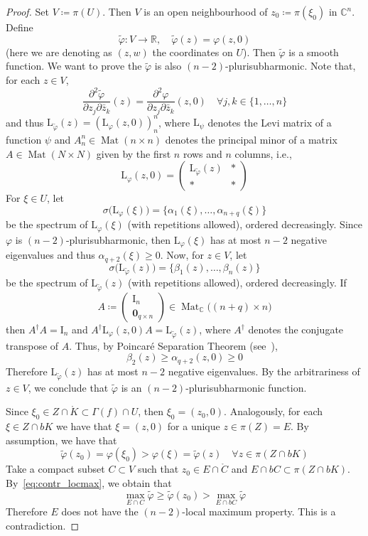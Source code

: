 \documentclass[reqno,oneside]{amsart}
\newcommand{\numberset}{\mathbb}
\newcommand{\R}{\numberset{R}}
\newcommand{\C}{\numberset{C}}
\renewcommand{\phi}{\varphi}
\DeclareMathOperator{\Mat}{Mat}
\renewcommand{\vec}{\boldsymbol}
\theoremstyle{definition}
\theoremstyle{plain}
\theoremstyle{remark}
\begin{document}
\begin{proof}
	Set $V\coloneqq\pi(U)$. Then $V$ is an open neighbourhood of $z_0\coloneqq\pi(\xi_0)$ in $\C^n$. Define
	\[
		\tilde\phi:V\to\R, \quad \tilde\phi(z)=\phi(z,0)
	\]
	(here we are denoting as $(z,w)$ the coordinates on $U$). Then $\tilde\phi$ is a smooth function. We want to prove the $\tilde\phi$ is also $(n-2)$-plurisubharmonic. Note that, for each $z\in V$,
	\[
		\frac{\partial^2\tilde\phi}{\partial z_j\partial\bar{z}_k}(z)=\frac{\partial^2\phi}{\partial z_j\partial\bar{z}_k}(z,0) \quad \forall j,k\in\{1,\dots,n\}
	\]
	and thus $\mathrm{L}_{\tilde\phi}(z)=(\mathrm{L}_\phi(z,0))^n_n$, where $\mathrm{L}_\psi$ denotes the Levi matrix of a function $\psi$ and $A^n_n\in\Mat(n\times n)$ denotes the principal minor of a matrix $A\in\Mat(N\times N)$ given by the first $n$ rows and $n$ columns, i.e.,
	\[
		\mathrm{L}_\phi(z,0)=
		\begin{pmatrix}
			\mathrm{L}_{\tilde\phi}(z) & * \\
			* & *
		\end{pmatrix}
	\]
	For $\xi\in U$, let
	\[
		\sigma\bigl(\mathrm{L}_\phi(\xi)\bigr)=\{\alpha_1(\xi),\dots,\alpha_{n+q}(\xi)\}
	\]
	be the spectrum of $\mathrm{L}_\phi(\xi)$ (with repetitions allowed), ordered decreasingly. Since $\phi$ is $(n-2)$-plurisubharmonic, then $\mathrm{L}_\phi(\xi)$ has at most $n-2$ negative eigenvalues and thus $\alpha_{q+2}(\xi)\geq 0$. Now, for $z\in V$, let
	\[
		\sigma\bigl(\mathrm{L}_{\tilde\phi}(z)\bigr)=\{\beta_1(z),\dots,\beta_n(z)\}
	\]
	be the spectrum of $\mathrm{L}_{\tilde\phi}(z)$ (with repetitions allowed), ordered decreasingly. If
	\[
		A\coloneqq
		\begin{pmatrix}
			\mathrm{I}_n \\
			\vec{0}_{q\times n}
		\end{pmatrix}
		\in\Mat_\C\bigl((n+q)\times n\bigr)
	\]
	then $A^\dagger A=\mathrm{I}_n$ and $A^\dagger\mathrm{L}_\phi(z,0)A=\mathrm{L}_{\tilde\phi}(z)$, where $A^\dagger$ denotes the conjugate transpose of $A$. Thus, by Poincaré Separation Theorem (see~\cite[Theorem~2.1]{rao:separation}),
	\[
		\beta_2(z)\geq\alpha_{q+2}(z,0)\geq 0
	\]
	Therefore $\mathrm{L}_{\tilde\phi}(z)$ has at most $n-2$ negative eigenvalues. By the arbitrariness of $z\in V$, we conclude that $\tilde\phi$ is an $(n-2)$-plurisubharmonic function.
	
	Since $\xi_0\in Z\cap\mathring{K}\subset\Gamma(f)\cap U$, then $\xi_0=(z_0,0)$. Analogously, for each $\xi\in Z\cap bK$ we have that $\xi=(z,0)$ for a unique $z\in\pi(Z)=E$. By assumption, we have that
	\begin{equation}
	\label{eq:contr_locmax}
		\tilde\phi(z_0)=\phi(\xi_0)>\phi(\xi)=\tilde\phi(z) \quad \forall z\in\pi(Z\cap bK)
	\end{equation}
	Take a compact subset $C\subset V$ such that $z_0\in E\cap\mathring{C}$ and $E\cap bC\subset\pi(Z\cap bK)$. %
	By~\eqref{eq:contr_locmax}, we obtain that
	\[
		\max_{E\cap C}\tilde\phi\geq\tilde\phi(z_0)>\max_{E\cap bC}\tilde\phi
	\]
	Therefore $E$ does not have the $(n-2)$-local maximum property. This is a contradiction.
\end{proof}
\end{document}
